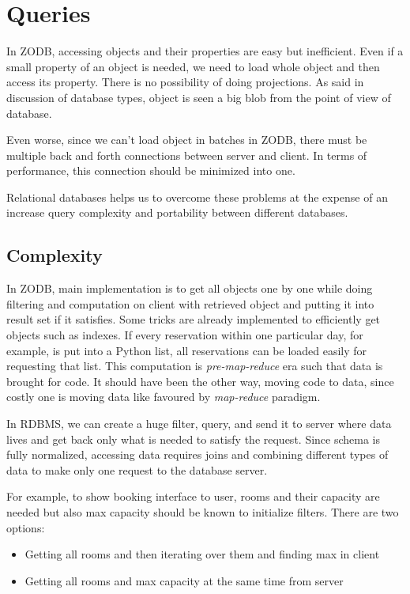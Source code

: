 \section{Queries}

In ZODB, accessing objects and their properties are easy but inefficient. Even if a small property of an object is needed, we need to load whole object and then access its property. There is no possibility of doing projections. As said in discussion of database types, object is seen a big blob from the point of view of database.

Even worse, since we can't load object in batches in ZODB, there must be multiple back and forth connections between server and client. In terms of performance, this connection should be minimized into one.

Relational databases helps us to overcome these problems at the expense of an increase query complexity and portability between different databases.

\subsection{Complexity}

In ZODB, main implementation is to get all objects one by one while doing filtering and computation on client with retrieved object and putting it into result set if it satisfies. Some tricks are already implemented to efficiently get objects such as indexes. If every reservation within one particular day, for example, is put into a Python list, all reservations can be loaded easily for requesting that list. This computation is \textit{pre-map-reduce} era such that data is brought for code. It should have been the other way, moving code to data, since costly one is moving data like favoured by \textit{map-reduce} paradigm.

In RDBMS, we can create a huge filter, query, and send it to server where data lives and get back only what is needed to satisfy the request. Since schema is fully normalized, accessing data requires joins and combining different types of data to make only one request to the database server.

For example, to show booking interface to user, rooms and their capacity are needed but also max capacity should be known to initialize filters. There are two options:
\begin{itemize}
  \item Getting all rooms and then iterating over them and finding max in client
  \item Getting all rooms and max capacity at the same time from server
\end{itemize}

